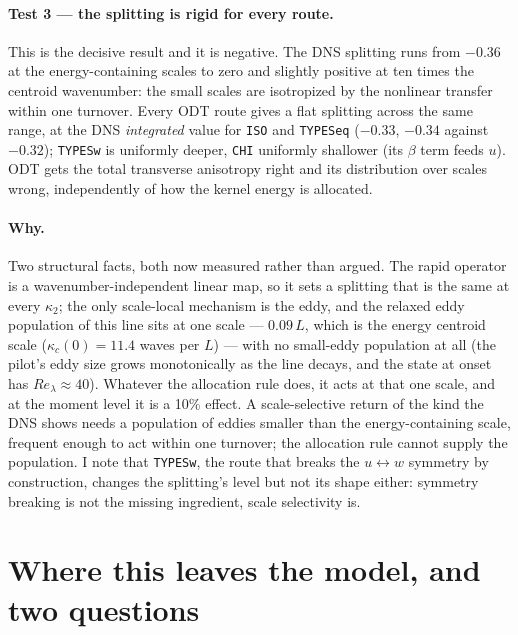 \documentclass[11pt,a4paper]{article}
\begin{document}
\paragraph{Test 3 --- the splitting is rigid for every route.}
This is the decisive result and it is negative. The DNS splitting runs
from $-0.36$ at the energy-containing scales to zero and slightly positive
at ten times the centroid wavenumber: the small scales are isotropized by
the nonlinear transfer within one turnover. Every ODT route gives a flat
splitting across the same range, at the DNS \emph{integrated} value for
\texttt{ISO} and \texttt{TYPESeq} ($-0.33$, $-0.34$ against $-0.32$);
\texttt{TYPESw} is uniformly deeper, \texttt{CHI} uniformly shallower
(its $\beta$ term feeds $u$). ODT gets the total transverse anisotropy
right and its distribution over scales wrong, independently of how the
kernel energy is allocated.

\paragraph{Why.} Two structural facts, both now measured rather than
argued. The rapid operator is a wavenumber-independent linear map, so it
sets a splitting that is the same at every $\kappa_2$; the only
scale-local mechanism is the eddy, and the relaxed eddy population of
this line sits at one scale --- $0.09\,L$, which is the energy centroid
scale ($\kappa_c(0)=11.4$ waves per $L$) --- with no small-eddy population
at all (the pilot's eddy size grows monotonically as the line decays, and
the state at onset has $Re_\lambda\approx40$). Whatever the allocation
rule does, it acts at that one scale, and at the moment level it is a
10\% effect. A scale-selective return of the kind the DNS shows needs a
population of eddies smaller than the energy-containing scale, frequent
enough to act within one turnover; the allocation rule cannot supply the
population. I note that \texttt{TYPESw}, the route that breaks the
$u\leftrightarrow w$ symmetry by construction, changes the splitting's
level but not its shape either: symmetry breaking is not the missing
ingredient, scale selectivity is.

\section{Where this leaves the model, and two questions}
\end{document}
